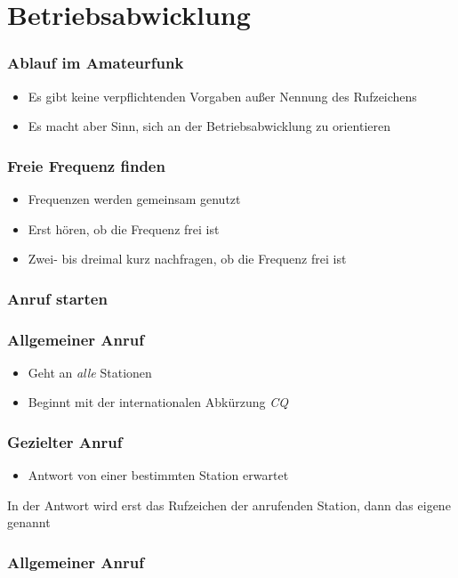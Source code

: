 
\section{Betriebsabwicklung}
\label{section:betriebsabwicklung}
\begin{frame}%

\frametitle{Ablauf im Amateurfunk}
\begin{itemize}
  \item Es gibt keine verpflichtenden Vorgaben außer Nennung des Rufzeichens
  \item Es macht aber Sinn, sich an der Betriebsabwicklung zu orientieren
  \end{itemize}

\end{frame}

\begin{frame}
\frametitle{Freie Frequenz finden}
\begin{itemize}
  \item Frequenzen werden gemeinsam genutzt
  \item Erst hören, ob die Frequenz frei ist
  \item Zwei- bis dreimal kurz nachfragen, ob die Frequenz frei ist
  \end{itemize}

\end{frame}

\begin{frame}
\frametitle{Anruf starten}
    \pause
    
\frametitle{Allgemeiner Anruf}
\begin{itemize}
  \item Geht an \emph{alle} Stationen
  \item Beginnt mit der internationalen Abkürzung \emph{CQ}
  \end{itemize}
    \pause
    
\frametitle{Gezielter Anruf}
\begin{itemize}
  \item Antwort von einer bestimmten Station erwartet
  \end{itemize}
    \pause
    In der Antwort wird erst das Rufzeichen der anrufenden Station, dann das eigene genannt

\end{frame}

\begin{frame}
\frametitle{Allgemeiner Anruf}
    \pause{}\pause{}\pause{}\pause{}\pause{}\pause{}


\end{frame}

